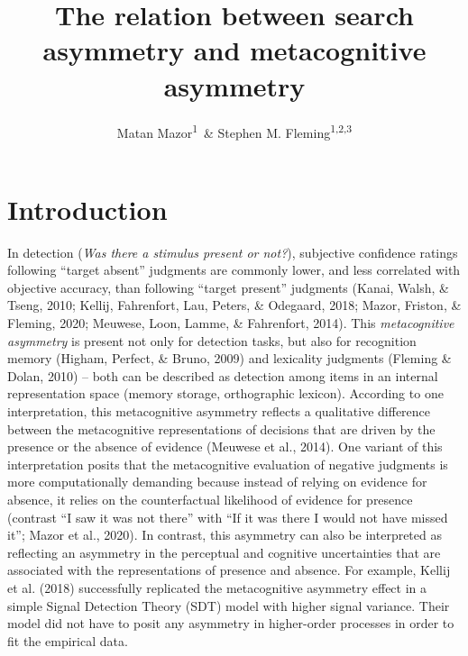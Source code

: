 \documentclass[
  english,
  man,floatsintext]{apa6}
\author{Matan Mazor\textsuperscript{1}\ \& Stephen M. Fleming\textsuperscript{1,2,3}}
\affiliation{
\vspace{0.5cm}
\textsuperscript{1} Wellcome Centre for Human Neuroimaging, UCL\\\textsuperscript{2} Max Planck UCL Centre for Computational Psychiatry and Ageing Research\\\textsuperscript{3} Department of Experimental Psychology, UCL}
\title{The relation between search asymmetry and metacognitive asymmetry}
\date{}
\begin{document}
\maketitle

\hypertarget{introduction}{%
\section{Introduction}\label{introduction}}

In detection (\emph{Was there a stimulus present or not?}), subjective confidence ratings following \enquote{target absent} judgments are commonly lower, and less correlated with objective accuracy, than following \enquote{target present} judgments (Kanai, Walsh, \& Tseng, 2010; Kellij, Fahrenfort, Lau, Peters, \& Odegaard, 2018; Mazor, Friston, \& Fleming, 2020; Meuwese, Loon, Lamme, \& Fahrenfort, 2014). This \emph{metacognitive asymmetry} is present not only for detection tasks, but also for recognition memory (Higham, Perfect, \& Bruno, 2009) and lexicality judgments (Fleming \& Dolan, 2010) -- both can be described as detection among items in an internal representation space (memory storage, orthographic lexicon). According to one interpretation, this metacognitive asymmetry reflects a qualitative difference between the metacognitive representations of decisions that are driven by the presence or the absence of evidence (Meuwese et al., 2014). One variant of this interpretation posits that the metacognitive evaluation of negative judgments is more computationally demanding because instead of relying on evidence for absence, it relies on the counterfactual likelihood of evidence for presence (contrast ``I saw it was not there'' with ``If it was there I would not have missed it''; Mazor et al., 2020). In contrast, this asymmetry can also be interpreted as reflecting an asymmetry in the perceptual and cognitive uncertainties that are associated with the representations of presence and absence. For example, Kellij et al. (2018) successfully replicated the metacognitive asymmetry effect in a simple Signal Detection Theory (SDT) model with higher signal variance. Their model did not have to posit any asymmetry in higher-order processes in order to fit the empirical data.
\end{document}
